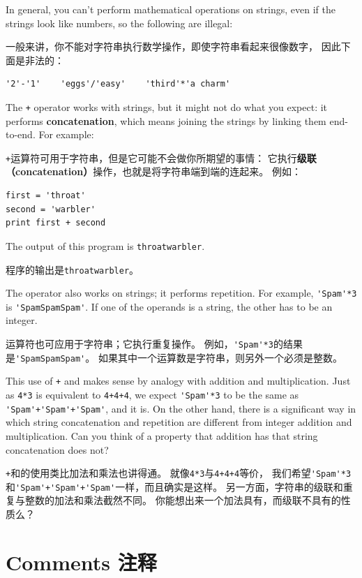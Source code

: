 \documentclass[10pt]{book}
\begin{document}
\begin{CJK}{UTF8}{gbsn}
In general, you can't perform mathematical operations on strings, even
if the strings look like numbers, so the following are illegal:

一般来讲，你不能对字符串执行数学操作，即使字符串看起来很像数字，
因此下面是非法的：

\begin{verbatim}
'2'-'1'    'eggs'/'easy'    'third'*'a charm'
\end{verbatim}
%
The {\tt +} operator works with strings, but it
might not do what you expect: it performs
{\bf concatenation}, which means joining the strings by
linking them end-to-end.  For example:

{\tt +}运算符可用于字符串，但是它可能不会做你所期望的事情：
它执行{\bf 级联（concatenation）}操作，也就是将字符串端到端的连起来。
例如：

\begin{verbatim}
first = 'throat'
second = 'warbler'
print first + second
\end{verbatim}
%
The output of this program is {\tt throatwarbler}.

程序的输出是{\tt throatwarbler}。

The {\tt *} operator also works on strings; it performs repetition.
For example, \verb"'Spam'*3" is \verb"'SpamSpamSpam'".  If one of the operands
is a string, the other has to be an integer.

{\tt *}运算符也可应用于字符串；它执行重复操作。
例如，\verb"'Spam'*3"的结果是\verb"'SpamSpamSpam'"。
如果其中一个运算数是字符串，则另外一个必须是整数。

This use of {\tt +} and {\tt *} makes sense by
analogy with addition and multiplication.  Just as {\tt 4*3} is
equivalent to {\tt 4+4+4}, we expect \verb"'Spam'*3" to be the same as
\verb"'Spam'+'Spam'+'Spam'", and it is.  On the other hand, there is a
significant way in which string concatenation and repetition are
different from integer addition and multiplication.
Can you think of a property that addition has
that string concatenation does not?

{\tt +}和{\tt *}的使用类比加法和乘法也讲得通。
就像{\tt 4*3}与{\tt 4+4+4}等价，
我们希望\verb"'Spam'*3"和\verb"'Spam'+'Spam'+'Spam'"一样，而且确实是这样。
另一方面，字符串的级联和重复与整数的加法和乘法截然不同。
你能想出来一个加法具有，而级联不具有的性质么？

\section{Comments 注释}


\end{CJK}
\end{document}
